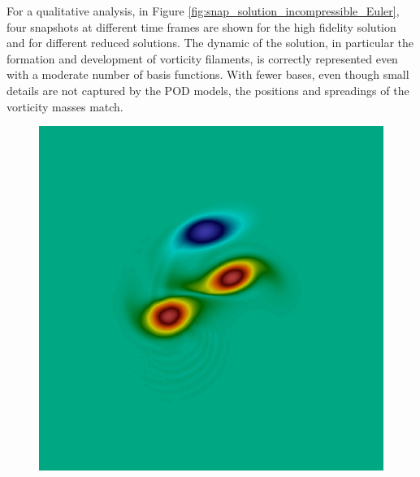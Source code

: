 For a qualitative analysis, in Figure \ref{fig:snap_solution_incompressible_Euler}, four snapshots at different time frames are shown for the high fidelity solution and for different reduced solutions. The dynamic of the solution, in particular the formation and development of vorticity filaments, is correctly represented even with a moderate number of basis functions. With fewer bases, even though small details are not captured by the POD models, the positions and spreadings of the vorticity masses match. 

\begin{figure}[h!]
\includegraphics[scale=0.06]{data/Incompressible_Euler/Snapshots/red_17_2.png}\hspace{1em}

\end{figure}
